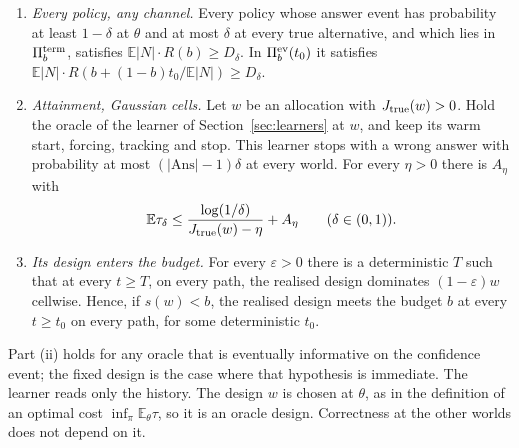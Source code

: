 \begin{theorem}
\label{thm:repairlaw}
\begin{enumerate}
\item[(i)] \emph{Every policy, any channel.} Every policy whose answer event has probability at
least $1-\delta$ at $\theta$ and at most $\delta$ at every true alternative, and which lies in
$\Pi_b^{\rm term}$, satisfies $\mathbb E|N|\cdot R(b)\ge D_\delta$. In $\Pi_b^{\rm ev}(t_0)$ it
satisfies $\mathbb E|N|\cdot R(b+(1-b)t_0/\mathbb E|N|)\ge D_\delta$.
\item[(ii)] \emph{Attainment, Gaussian cells.} Let $w$ be an allocation with
$J_{\rm true}(w)>0$. Hold the oracle of the learner of Section~\ref{sec:learners} at $w$, and
keep its warm start, forcing, tracking and stop. This learner stops with a wrong answer with
probability at most $(|\mathrm{Ans}|-1)\delta$ at every world. For every $\eta>0$ there is
$A_\eta$ with
\[
\mathbb E\tau_\delta\le\frac{\log(1/\delta)}{J_{\rm true}(w)-\eta}+A_\eta
\qquad(\delta\in(0,1)).
\]
\item[(iii)] \emph{Its design enters the budget.} For every $\varepsilon>0$ there is a
deterministic $T$ such that at every $t\ge T$, on every path, the realised design dominates
$(1-\varepsilon)w$ cellwise. Hence, if $s(w)<b$, the realised design meets the budget $b$ at
every $t\ge t_0$ on every path, for some deterministic $t_0$.
\end{enumerate}
\end{theorem}

Part (ii) holds for any oracle that is eventually informative on the confidence event; the
fixed design is the case where that hypothesis is immediate. The learner reads only the
history. The design $w$ is chosen at $\theta$, as in the definition of an optimal cost
$\inf_\pi\mathbb E_\theta\tau$, so it is an oracle design. Correctness at the other worlds does
not depend on it.

